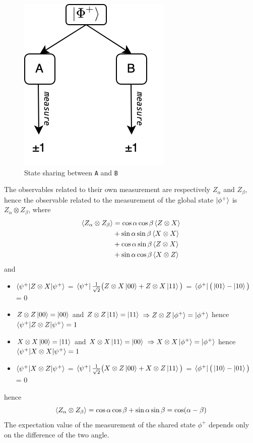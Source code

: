 \documentclass{article}
\begin{document}
\begin{figure}[h]
    \centering
    \includegraphics[scale=0.4]{bell-ineq-sharing-scheme.png}
    \caption{State sharing between \texttt{A} and \texttt{B}}
    \label{fig:sharing-scheme}
\end{figure}
\noindent
The observables related to their own measurement are respectively $Z_\alpha$ and
$Z_\beta$, hence the observable related to the measurement of the global state
$\ket{\phi^+}$ is $Z_\alpha \otimes Z_\beta$, where
\begin{equation}
    \begin{aligned}
        \braket{Z_\alpha \otimes Z_\beta}
            &= \cos \alpha \cos \beta \braket{Z \otimes X} \\
            &+ \sin \alpha \sin \beta \braket{X \otimes X} \\
            &+ \cos \alpha \sin \beta \braket{Z \otimes X} \\
            &+ \sin \alpha \cos \beta \braket{X \otimes Z}
    \end{aligned}
\end{equation}
and
\begin{itemize}[label=-]
    \item $\braket{\psi^+|Z \otimes X|\psi^+}$ =
        $\bra{\psi^+} \frac{1}{\sqrt2}\big(Z \otimes X\ket{00} + Z \otimes X\ket{11}\big)$ =
        $\bra{\phi^+}\big(\ket{01}-\ket{10}\big)$ = 0
    \item $Z \otimes Z \ket{00} = \ket{00}$ and $Z \otimes Z \ket{11} = \ket{11}$
        $\Rightarrow Z \otimes Z \ket{\phi^+} = \ket{\phi^+}$
        hence $\braket{\psi^+|Z \otimes Z|\psi^+} = 1$
    \item $X \otimes X \ket{00} = \ket{11}$ and $X \otimes X \ket{11} = \ket{00}$
    $\Rightarrow X \otimes X \ket{\phi^+} = \ket{\phi^+}$
    hence $\braket{\psi^+|X \otimes X|\psi^+} = 1$
    \item $\braket{\psi^+|X \otimes Z|\psi^+}$ =
    $\bra{\psi^+} \frac{1}{\sqrt2}\big(X \otimes Z\ket{00} + X \otimes Z\ket{11}\big)$ =
    $\bra{\phi^+}\big(\ket{10}-\ket{01}\big)$ = 0
\end{itemize}
hence
\begin{equation}
    \braket{Z_\alpha \otimes Z_\beta} =
        \cos \alpha \cos \beta + \sin \alpha \sin \beta = \cos(\alpha - \beta)
\end{equation}
The expectation value of the measurement of the shared state $\phi^+$
depends only on the difference of the two angle.
\end{document}
